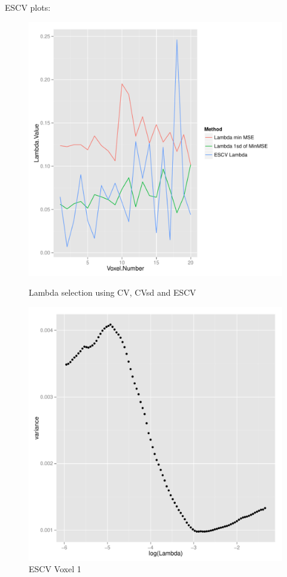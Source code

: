 \documentclass[english]{amsart}
\begin{document}
ESCV plots: 

\begin{figure}[H]
  \includegraphics[width=\linewidth, height=200pts]{lambda_value.pdf}
  \caption{Lambda selection using CV, CVsd and ESCV}
\endminipage\hfill
\vspace{-5mm}
  \includegraphics[width=\linewidth]{Voxel_1_ESCV.pdf}
  \caption{ESCV Voxel 1}
\endminipage
\end{figure}
\end{document}
